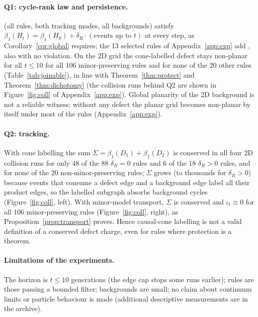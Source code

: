 \documentclass[10pt]{article}
\theoremstyle{definition}
\theoremstyle{plain}
\theoremstyle{remark}
\newcommand{\Betti}{\beta_1}
\begin{document}
\paragraph{Q1: cycle-rank law and persistence.}  (all rules, both tracking modes, all backgrounds) satisfy $\Betti(H_t)=\Betti(H_0)+\delta_R\cdot(\text{events up to }t)$ at every step, as Corollary~\ref{cor:global} requires; the 13 selected rules of Appendix~\ref{app:exp} add \unskip, also with no violation. On the 2D grid the cone-labelled defect stays non-planar for all $t\le10$ for all 106 minor-preserving rules and for none of the 20 other rules (Table~\ref{tab:joinable}), in line with Theorem~\ref{thm:protect} and Theorem~\ref{thm:dichotomy} (the collision runs behind Q2 are shown in Figure~\ref{fig:coll} of Appendix~\ref{app:exp}). Global planarity of the 2D background is not a reliable witness: without any defect the planar grid becomes non-planar by itself under most of the rules (Appendix~\ref{app:exp}).

\paragraph{Q2: tracking.} With cone labelling the sum $\Sigma=\Betti(D_1)+\Betti(D_2)$ is conserved in all four 2D collision runs for only 48 of the 88 $\delta_R=0$ rules and 6 of the 18 $\delta_R>0$ rules, and for none of the 20 non-minor-preserving rules; $\Sigma$ grows (to thousands for $\delta_R>0$) because events that consume a defect edge and a background edge label all their product edges, so the labelled subgraph absorbs background cycles (Figure~\ref{fig:coll}, left). With minor-model transport, $\Sigma$ is conserved and $\iota_t\equiv0$ for all 106 minor-preserving rules (Figure~\ref{fig:coll}, right), as Proposition~\ref{prop:transport} proves. Hence causal-cone labelling is not a valid definition of a conserved defect charge, even for rules where protection is a theorem.
\begin{table}[t]\centering\scriptsize

\caption{All 126 joinable $2_2\to3_2$ rules, 2D grid ($n=8$), $K_5$ and $K_{3,3}$, canonical and random order (4 runs per rule and experiment). Entries: rules for which the property holds in all 4 runs / rules with complete data. ``Cone'': causal-cone labelling; ``model'': minor-model transport.}\label{tab:joinable}
\end{table}

\paragraph{Limitations of the experiments.} The horizon is $t\le10$ generations (the edge cap stops some runs earlier); rules are those passing a bounded filter; backgrounds are small; no claim about continuum limits or particle behaviour is made (additional descriptive measurements are in the archive).
\end{document}
